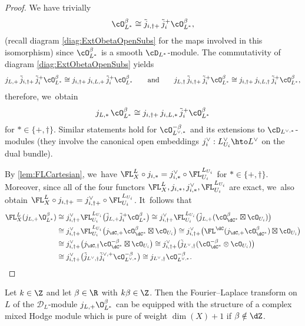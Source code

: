 \begin{proof}
We have trivially
\[
\cO^\beta_{L^{*}} \cong \tilde{j}_{i,\dag+}\, \tilde{j}_i^+ \cO^\beta_{L^{*}},
\]
(recall diagram \eqref{diag:ExtObetaOpenSubs} for the maps involved in this isomorphism) since $\cO_{L^*}^\beta$ is a smooth $\cD_{L^*}$\nobreakdash-mod\-ule. The commutativity of
diagram \eqref{diag:ExtObetaOpenSubs} yields
\[
j_{L,+}\,\tilde{j}_{i,\dag+}\, \tilde{j}_i^+\cO_{L^*}^\beta \cong j_{i,\dag+}\, j_{i,L,+}\, \tilde{j}_i^+\cO_{L^*}^\beta
\quad\quad
\textup{and}
\quad\quad
j_{L,\dag}\,\tilde{j}_{i,\dag+}\, \tilde{j}_i^+\cO_{L^*}^\beta \cong j_{i,\dag+}\, j_{i,L,\dag}\, \tilde{j}_i^+\cO_{L^*}^\beta,
\]
therefore, we~obtain
\[
j_{L,\ast}\, \cO_{L^*}^\beta \cong j_{i,\dag+}\, j_{i,L,\ast}\, \tilde{j}_i^+\cO_{L^*}^\beta
\]
for $\ast\in\{+,\dag\}$.
Similar statements hold for $\cO_{L^{\vee,*}}^{-\beta}$ and its extensions to $\cD_{L^{\vee,*}}$\nobreakdash-mod\-ules (they involve the canonical open embeddings $j_i^\vee:L^\vee_{U_i}\hto L^\vee$ on the dual bundle).

By \cref{lem:FLCartesian}, we~have $\FL^L_X \circ j_{i,\ast}=j^\vee_{i,\ast}\circ\FL^{L_{U_i}}_{U_i}$ for $\ast\in\{+,\dag\}$. Moreover, since
all of the four functors $\FL^L_X, j_{i,\ast}, j^\vee_{i,\ast}, \FL^{L_{U_i}}_{U_i}$
are exact, we~also obtain $\FL^L_X \circ j_{i,\dag+}=j^\vee_{i,\dag+}\circ\FL^{L_{U_i}}_{U_i}$. It~follows that
\begin{align*}
\FL^L_X(j_{L,+} \O_{L^{*}}^{\beta})
&\cong 
j^\vee_{i,\dag+} \FL^{L_{U_i}}_{U_i} \bigl(\tilde{j}_{L,+} \tilde{j}_{i}^+ \cO^\beta_{L^{*}} \bigr)
\cong 
j^\vee_{i,\dag+} \FL^{L_{U_i}}_{U_i} \bigl(\tilde{j}_{L,+}(\cO_{\dC^*}^\beta\boxtimes\cO_{U_i}) \bigr)
\\
&\cong j^\vee_{i,\dag+} \FL^{L_{U_i}}_{U_i} \bigl(j_{\dC,+}\cO_{\dC^*}^\beta\boxtimes\cO_{U_i}\bigr)
\cong j^\vee_{i,\dag+} \bigl(\FL^{\dC} (j_{\dC,+}\cO_{\dC^*}^\beta)\boxtimes\cO_{U_i}\bigr)
\\
&\cong j^\vee_{i,\dag+} \bigl(j_{\dC,\dag}\cO_{\dC^*}^{-\beta}\boxtimes\cO_{U_i}\bigr)
\cong j^\vee_{i,\dag+} \bigl(\tilde{j}_{L^\vee,\dag}(\cO_{\dC^*}^{-\beta}\otimes \cO_{U_i})\bigr)
\\
&\cong j^\vee_{i,\dag+} \bigl(\tilde{j}_{L^\vee,\dag} \tilde{j}_i^{\vee,+}\cO^{-\beta}_{L^{\vee,*}}\bigr)
\cong j_{L^\vee,\dag}\cO^{-\beta}_{L^{\vee,*}}.\qedhere
\end{align*}
\end{proof}

\begin{cor} \label{cor:FLofOBetaIsMHM}
Let $k \in \Z$ and let $\beta \in \R$ with $k\beta \in \Z$. Then the Fourier--Laplace transform on $L$ of the $\mathscr{D}_{L}$\nobreakdash-mod\-ule $j_{L,+}\O_{L^*}^\beta$ can be equipped with the structure of a complex mixed Hodge module which is pure of weight $\dim(X)+1$ if $\beta\notin \dZ$.
\end{cor}

